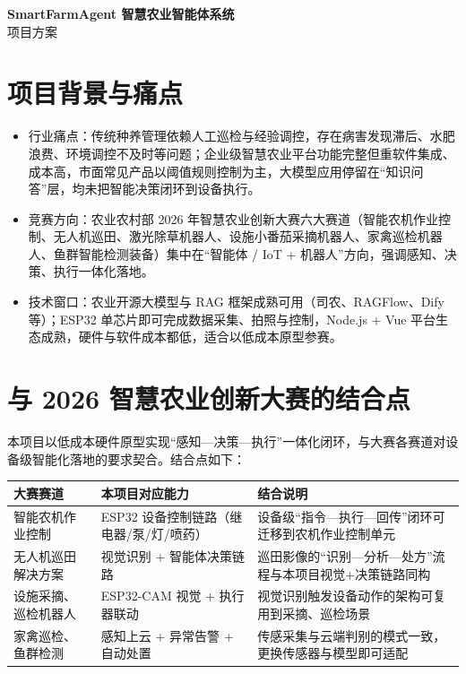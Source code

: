 \documentclass[11pt]{ctexart}
\begin{document}
\begin{center}
  {\LARGE\bfseries SmartFarmAgent 智慧农业智能体系统}\\[4pt]
  {\large 项目方案}
\end{center}

\vspace{0.5em}

\section{项目背景与痛点}
\begin{itemize}
  \item 行业痛点：传统种养管理依赖人工巡检与经验调控，存在病害发现滞后、水肥浪费、环境调控不及时等问题；企业级智慧农业平台功能完整但重软件集成、成本高，市面常见产品以阈值规则控制为主，大模型应用停留在“知识问答”层，均未把智能决策闭环到设备执行。
  \item 竞赛方向：农业农村部 2026 年智慧农业创新大赛六大赛道（智能农机作业控制、无人机巡田、激光除草机器人、设施小番茄采摘机器人、家禽巡检机器人、鱼群智能检测装备）集中在“智能体 / IoT + 机器人”方向，强调感知、决策、执行一体化落地。
  \item 技术窗口：农业开源大模型与 RAG 框架成熟可用（司农、RAGFlow、Dify 等）；ESP32 单芯片即可完成数据采集、拍照与控制，Node.js + Vue 平台生态成熟，硬件与软件成本都低，适合以低成本原型参赛。
\end{itemize}

\section{与 2026 智慧农业创新大赛的结合点}

本项目以低成本硬件原型实现“感知—决策—执行”一体化闭环，与大赛各赛道对设备级智能化落地的要求契合。结合点如下：

\begin{longtable}{p{3.6cm}p{5.0cm}p{6.6cm}}
  \toprule
  大赛赛道 & 本项目对应能力 & 结合说明 \\
  \midrule
  智能农机作业控制 & ESP32 设备控制链路（继电器/泵/灯/喷药） & 设备级“指令—执行—回传”闭环可迁移到农机作业控制单元 \\
  无人机巡田解决方案 & 视觉识别 + 智能体决策链路 & 巡田影像的“识别—分析—处方”流程与本项目视觉+决策链路同构 \\
  设施采摘、巡检机器人 & ESP32-CAM 视觉 + 执行器联动 & 视觉识别触发设备动作的架构可复用到采摘、巡检场景 \\
  家禽巡检、鱼群检测 & 感知上云 + 异常告警 + 自动处置 & 传感采集与云端判别的模式一致，更换传感器与模型即可适配 \\
  \bottomrule
\end{longtable}
\end{document}
